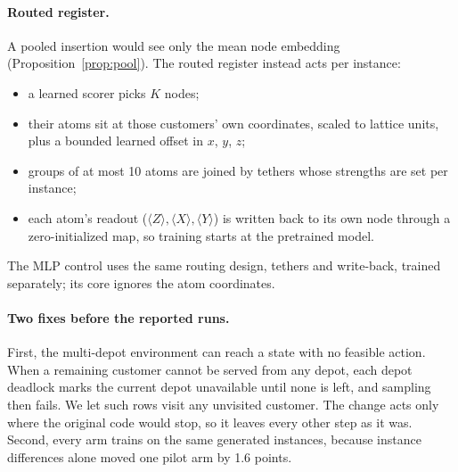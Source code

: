 \documentclass{article}
\begin{document}
\paragraph{Routed register.} A pooled insertion would see only the mean node embedding (Proposition~\ref{prop:pool}).
The routed register instead acts per instance:
\begin{itemize}
  \item a learned scorer picks $K$ nodes;
  \item their atoms sit at those customers' own coordinates, scaled to lattice units, plus a bounded learned offset in $x$, $y$, $z$;
  \item groups of at most 10 atoms are joined by tethers whose strengths are set per instance;
  \item each atom's readout ($\langle Z\rangle, \langle X\rangle, \langle Y\rangle$) is written back to its own node through a
  zero-initialized map, so training starts at the pretrained model.
\end{itemize}
The MLP control uses the same routing design, tethers and write-back, trained separately; its core ignores the atom
coordinates.

\paragraph{Two fixes before the reported runs.} First, the multi-depot environment can reach a state with no feasible
action. When a remaining customer cannot be served from any depot, each depot deadlock marks the current depot
unavailable until none is left, and sampling then fails. We let such rows visit any unvisited customer. The change acts
only where the original code would stop, so it leaves every other step as it was. Second, every arm trains on the same
generated instances, because instance differences alone moved one pilot arm by 1.6 points.
\end{document}
